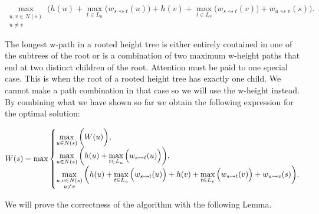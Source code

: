 $$ \max\limits_{\substack{u, v \in N(s) \\ u \ne v}}\bigg( h(u) + \max\limits_{t \in L_u}\Big(w_{s \rightsquigarrow t}(u)\Big) + h(v) + \max\limits_{t \in L_v}\Big(w_{s \rightsquigarrow t}(v)\Big) + w_{u \rightsquigarrow v}(s)\bigg). $$

The longest w-path in a rooted height tree is either entirely contained in one of the subtrees of the root or is a combination of two maximum w-height paths that end at two distinct children of the root. Attention must be paid to one special case. This is when the root of a rooted height tree has exactly one child. We cannot make a path combination in that case so we will use the w-height instead. By combining what we have shown so far we obtain the following expression for the optimal solution:



$$
W(s) = \max\left\{
   \begin{array}{@{}l@{\thinspace}l}
       \max\limits_{u \in N(s)}\bigg(W(u)\bigg), \\
       \max\limits_{u \in N(s)} \bigg( h(u) + \max\limits_{t \in L_u}\Big(w_{s \rightsquigarrow t}(u)\Big) \bigg), \\
       \max\limits_{\substack{u, v \in N(s) \\ u \ne v}} \bigg( h(u) + \max\limits_{t \in L_u}\Big(w_{s \rightsquigarrow t}(u)\Big) + h(v) + \max\limits_{t \in L_v}\Big(w_{s \rightsquigarrow t}(v)\Big) + w_{u \rightsquigarrow v}(s) \bigg). \\
   \end{array}
\right.
\label{eq:uv_all}
$$

We will prove the correctness of the algorithm with the following Lemma.

